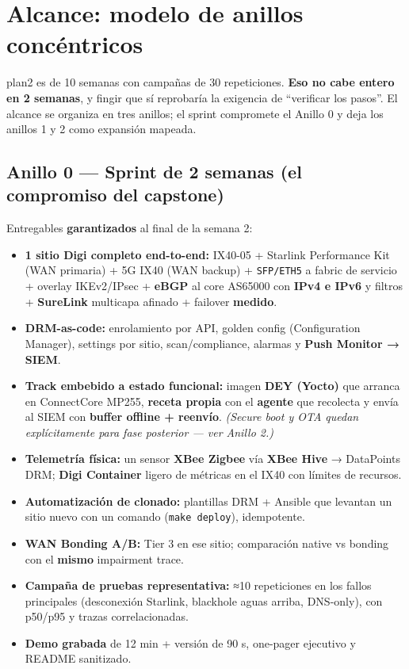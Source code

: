 \documentclass[11pt,a4paper]{article}
\begin{document}
\section{Alcance: modelo de anillos concéntricos}

plan2 es de 10 semanas con campañas de 30 repeticiones. \textbf{Eso no cabe entero en 2 semanas}, y fingir que sí reprobaría la exigencia de ``verificar los pasos''. El alcance se organiza en tres anillos; el sprint compromete el Anillo 0 y deja los anillos 1 y 2 como expansión mapeada.

\subsection*{Anillo 0 — Sprint de 2 semanas (el compromiso del capstone)}
Entregables \textbf{garantizados} al final de la semana 2:
\begin{itemize}
  \item \textbf{1 sitio Digi completo end-to-end:} IX40-05 + Starlink Performance Kit (WAN primaria) + 5G IX40 (WAN backup) + \texttt{SFP/ETH5} a fabric de servicio + overlay IKEv2/IPsec + \textbf{eBGP} al core AS65000 con \textbf{IPv4 e IPv6} y filtros + \textbf{SureLink} multicapa afinado + failover \textbf{medido}.
  \item \textbf{DRM-as-code:} enrolamiento por API, golden config (Configuration Manager), settings por sitio, scan/compliance, alarmas y \textbf{Push Monitor → SIEM}.
  \item \textbf{Track embebido a estado funcional:} imagen \textbf{DEY (Yocto)} que arranca en ConnectCore MP255, \textbf{receta propia} con el \textbf{agente} que recolecta y envía al SIEM con \textbf{buffer offline + reenvío}. \emph{(Secure boot y OTA quedan explícitamente para fase posterior — ver Anillo 2.)}
  \item \textbf{Telemetría física:} un sensor \textbf{XBee Zigbee} vía \textbf{XBee Hive} → DataPoints DRM; \textbf{Digi Container} ligero de métricas en el IX40 con límites de recursos.
  \item \textbf{Automatización de clonado:} plantillas DRM + Ansible que levantan un sitio nuevo con un comando (\texttt{make deploy}), idempotente.
  \item \textbf{WAN Bonding A/B:} Tier 3 en ese sitio; comparación native vs bonding con el \textbf{mismo} impairment trace.
  \item \textbf{Campaña de pruebas representativa:} ≈10 repeticiones en los fallos principales (desconexión Starlink, blackhole aguas arriba, DNS-only), con p50/p95 y trazas correlacionadas.
  \item \textbf{Demo grabada} de 12 min + versión de 90 s, one-pager ejecutivo y README sanitizado.
\end{itemize}
\end{document}

